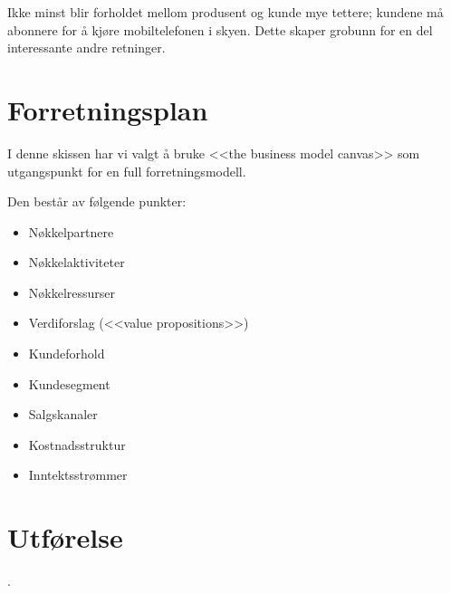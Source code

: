 Ikke minst blir forholdet mellom produsent og kunde mye tettere; kundene må
abonnere for å kjøre mobiltelefonen i skyen. Dette skaper grobunn for en del
interessante andre retninger.

\section*{Forretningsplan}

I denne skissen har vi valgt å bruke <<the business model canvas>>
\cite{oswalder} som utgangspunkt for en full forretningsmodell.

Den består av følgende punkter:

\begin{itemize}
  \item Nøkkelpartnere
  \item Nøkkelaktiviteter
  \item Nøkkelressurser
  \item Verdiforslag (<<value propositions>>)
  \item Kundeforhold
  \item Kundesegment
  \item Salgskanaler
  \item Kostnadsstruktur
  \item Inntektsstrømmer
\end{itemize}

\section*{Utførelse}



\cite{bessant}.

